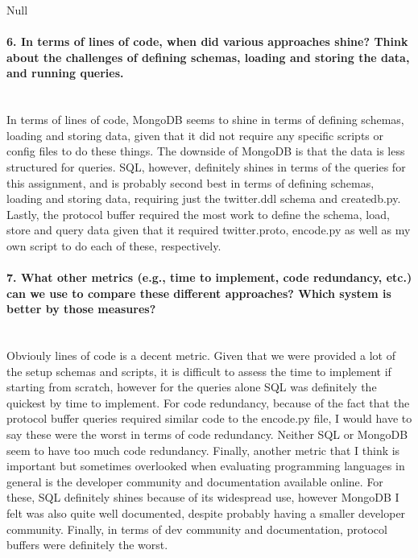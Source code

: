 \documentclass[12pt]{article}
\begin{document}
Null

\paragraph{6. In terms of lines of code, when did various approaches shine? Think about the challenges of defining schemas, loading and storing the data, and running queries.}\mbox{}\\

In terms of lines of code, MongoDB seems to shine in terms of defining schemas, loading and storing data, given that it did not require any specific scripts or config files to do these things. The downside of MongoDB is that the data is less structured for queries. SQL, however, definitely shines in terms of the queries for this assignment, and is probably second best in terms of defining schemas, loading and storing data, requiring just the twitter.ddl schema and createdb.py. Lastly, the protocol buffer required the most work to define the schema, load, store and query data given that it required twitter.proto, encode.py as well as my own script to do each of these, respectively.   

\paragraph{7. What other metrics (e.g., time to implement, code redundancy, etc.) can we use to compare these different approaches? Which system is better by those measures?}\mbox{}\\

Obviouly lines of code is a decent metric. Given that we were provided a lot of the setup schemas and scripts, it is difficult to assess the time to implement if starting from scratch, however for the queries alone SQL was definitely the quickest by time to implement. For code redundancy, because of the fact that the protocol buffer queries required similar code to the encode.py file, I would have to say these were the worst in terms of code redundancy. Neither SQL or MongoDB seem to have too much code redundancy.  Finally, another metric that I think is important but sometimes overlooked when evaluating programming languages in general is the developer community and documentation available online. For these, SQL definitely shines because of its widespread use, however MongoDB I felt was also quite well documented, despite probably having a smaller developer community. Finally, in terms of dev community and documentation, protocol buffers were definitely the worst.
\end{document}
